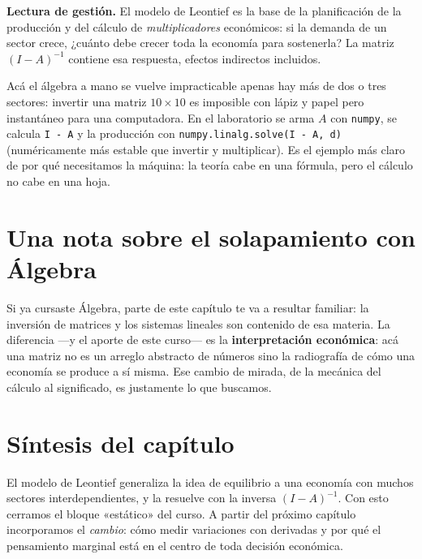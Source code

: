 \begin{ideabox}
\textbf{Lectura de gestión.} El modelo de Leontief es la base de la planificación de la producción y del cálculo de \emph{multiplicadores} económicos: si la demanda de un sector crece, ¿cuánto debe crecer toda la economía para sostenerla? La matriz $(I-A)^{-1}$ contiene esa respuesta, efectos indirectos incluidos.
\end{ideabox}

\begin{labbox}
Acá el álgebra a mano se vuelve impracticable apenas hay más de dos o tres sectores: invertir una matriz $10\times 10$ es imposible con lápiz y papel pero instantáneo para una computadora. En el laboratorio se arma $A$ con \texttt{numpy}, se calcula \texttt{I - A} y la producción con \texttt{numpy.linalg.solve(I - A, d)} (numéricamente más estable que invertir y multiplicar). Es el ejemplo más claro de por qué necesitamos la máquina: la teoría cabe en una fórmula, pero el cálculo no cabe en una hoja.
\end{labbox}

\section{Una nota sobre el solapamiento con Álgebra}

Si ya cursaste Álgebra, parte de este capítulo te va a resultar familiar: la inversión de matrices y los sistemas lineales son contenido de esa materia. La diferencia —y el aporte de este curso— es la \textbf{interpretación económica}: acá una matriz no es un arreglo abstracto de números sino la radiografía de cómo una economía se produce a sí misma. Ese cambio de mirada, de la mecánica del cálculo al significado, es justamente lo que buscamos.

\section{Síntesis del capítulo}

El modelo de Leontief generaliza la idea de equilibrio a una economía con muchos sectores interdependientes, y la resuelve con la inversa $(I-A)^{-1}$. Con esto cerramos el bloque «estático» del curso. A partir del próximo capítulo incorporamos el \emph{cambio}: cómo medir variaciones con derivadas y por qué el pensamiento marginal está en el centro de toda decisión económica.
